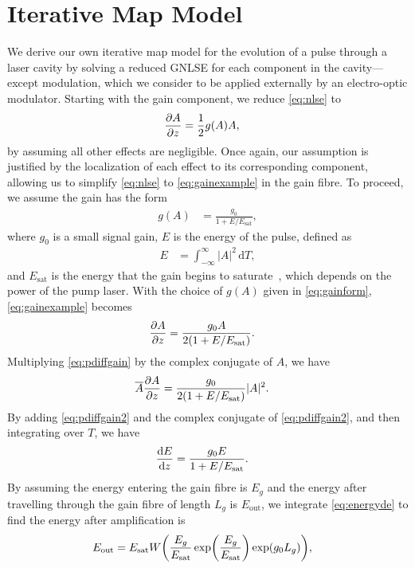 \documentclass[9pt,twocolumn,twoside]{osajnl}
\let\originalleft\left
\let\originalright\right
\renewcommand{\left}{\mathopen{}\mathclose\bgroup\originalleft}
\renewcommand{\right}{\aftergroup\egroup\originalright}
\providecommand{\df}{\textrm{d}} %
\newcommand{\diff}[3][\hspace{-0.5pt}]{\frac{\df^{#1}#2}{\df{#3}^{#1}}} %
\newcommand{\pdiff}[3][\hspace{-0.5pt}]{\frac{\partial^{#1}#2}{\partial{#3}^{#1}}} %
\newcommand{\Es}{E_{\textrm{sat}}} %
\begin{document}
\section{Iterative Map Model}
\label{sec:model}
We derive our own iterative map model for the evolution of a pulse through a laser cavity by solving a reduced GNLSE for each component in the cavity---except modulation, which we consider to be applied externally by an electro-optic modulator. Starting with the gain component, we reduce \eqref{eq:nlse} to 
\begin{align}
	\pdiff{A}{z} &= \frac{1}{2}g(A)A,
	\label{eq:gainexample}
\end{align}
by assuming all other effects are negligible. Once again, our assumption is justified by the localization of each effect to its corresponding component, allowing us to simplify \eqref{eq:nlse} to \eqref{eq:gainexample} in the gain fibre. To proceed, we assume the gain has the form
\begin{align}
	g(A) &= \frac{g_0}{1 + E / \Es},
	\label{eq:gainform}
\end{align}
where $g_0$ is a small signal gain, $E$ is the energy of the pulse, defined as
\begin{align}
	E &= \int_{-\infty}^\infty |A|^2 \, \df T,
	\label{eq:energy}
\end{align}
and $\Es$ is the energy that the gain begins to saturate~\cite{haus1984, shtyrina2017, silfvast2004}, which depends on the power of the pump laser. With the choice of $g(A)$ given in \eqref{eq:gainform}, \eqref{eq:gainexample} becomes
\begin{align}
	\pdiff{A}{z} &= \frac{g_0 A}{2 \left( 1 + E / \Es \right)}.
	\label{eq:pdiffgain}
\end{align}
Multiplying \eqref{eq:pdiffgain} by the complex conjugate of $A$, we have
\begin{align}
	\overline{A} \pdiff{A}{z} &= \frac{g_0}{2 \left( 1 + E / \Es \right)} |A|^2.
	\label{eq:pdiffgain2}
\end{align}
By adding \eqref{eq:pdiffgain2} and the complex conjugate of \eqref{eq:pdiffgain2}, and then integrating over $T$, we have
\begin{align}
	\diff{E}{z} &= \frac{g_0 E}{1 + E / \Es}.
	\label{eq:energyde}
\end{align}
By assuming the energy entering the gain fibre is $E_g$ and the energy after travelling through the gain fibre of length $L_g$ is $E_{\text{out}}$, we integrate \eqref{eq:energyde} to find the energy after amplification is
\begin{align}
	\label{eq:engain}
	E_{\text{out}} &= \Es W \left( \frac{E_g}{\Es} \exp \left( \frac{E_g}{\Es} \right) \exp( g_0 L_g ) \right),
\end{align}
\end{document}
